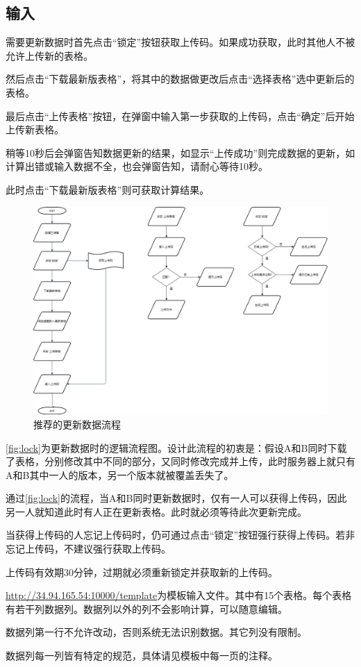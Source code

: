 \documentclass[UTF8,fontset=windowsnew]{ctexart}
\begin{document}
\subsection{输入}
需要更新数据时首先点击``锁定''按钮获取上传码。如果成功获取，此时其他人不被允许上传新的表格。\par
然后点击``下载最新版表格''，将其中的数据做更改后点击``选择表格''选中更新后的表格。\par
最后点击``上传表格''按钮，在弹窗中输入第一步获取的上传码，点击``确定''后开始上传新表格。\par
稍等10秒后会弹窗告知数据更新的结果，如显示``上传成功''则完成数据的更新，如计算出错或输入数据不全，也会弹窗告知，请耐心等待10秒。\par
此时点击``下载最新版表格''则可获取计算结果。\par
\begin{figure}[h]
  \centering
  \includegraphics[width=.8\textwidth]{image/lock.png}
  \caption{推荐的更新数据流程}
  \label{fig:lock}
\end{figure}
\autoref{fig:lock}为更新数据时的逻辑流程图。设计此流程的初衷是：假设A和B同时下载了表格，分别修改其中不同的部分，又同时修改完成并上传，此时服务器上就只有A和B其中一人的版本，另一个版本就被覆盖丢失了。\par
通过\autoref{fig:lock}的流程，当A和B同时更新数据时，仅有一人可以获得上传码，因此另一人就知道此时有人正在更新表格。此时就必须等待此次更新完成。\par
当获得上传码的人忘记上传码时，仍可通过点击``锁定''按钮强行获得上传码。若非忘记上传码，不建议强行获取上传码。\par
上传码有效期30分钟，过期就必须重新锁定并获取新的上传码。\par
\url{http://34.94.165.54:10000/template}为模板输入文件。其中有15个表格。每个表格有若干列数据列。数据列以外的列不会影响计算，可以随意编辑。\par
数据列第一行不允许改动，否则系统无法识别数据。其它列没有限制。\par
数据列每一列皆有特定的规范，具体请见模板中每一页的注释。
\end{document}

